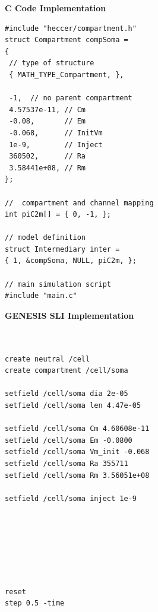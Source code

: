 \documentclass[12pt]{article}
\begin{document}
{\vspace*{1mm} \footnotesize
  \begin{minipage}{1\linewidth}
    
    \begin{minipage}[t]{.50\linewidth}
{\bf C Code Implementation}
\resetlinenumber
\begin{verbatim}
#include "heccer/compartment.h"
struct Compartment compSoma =
{
 // type of structure
 { MATH_TYPE_Compartment, },

 -1,  // no parent compartment
 4.57537e-11, // Cm
 -0.08,       // Em
 -0.068,      // InitVm
 1e-9,        // Inject
 360502,      // Ra
 3.58441e+08, // Rm
};

//  compartment and channel mapping
int piC2m[] = { 0, -1, };

// model definition
struct Intermediary inter =
{ 1, &compSoma, NULL, piC2m, };

// main simulation script
#include "main.c"

\end{verbatim}
    \end{minipage}
    \begin{minipage}[t]{.50\linewidth}
{\bf GENESIS SLI Implementation}
\resetlinenumber
\begin{verbatim}


create neutral /cell
create compartment /cell/soma

setfield /cell/soma dia 2e-05
setfield /cell/soma len 4.47e-05

setfield /cell/soma Cm 4.60608e-11
setfield /cell/soma Em -0.0800
setfield /cell/soma Vm_init -0.068
setfield /cell/soma Ra 355711
setfield /cell/soma Rm 3.56051e+08

setfield /cell/soma inject 1e-9







reset
step 0.5 -time
\end{verbatim}
    \end{minipage}
  \end{minipage}
  \linenumbers
  \vspace*{1mm}
}
\end{document}
